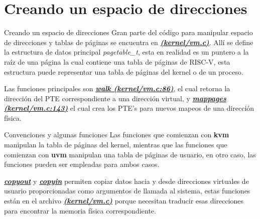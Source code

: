 \documentclass{libs/ufc_format}
\begin{document}
\section{Creando un espacio de direcciones}
\begin{frame}{Creando un espacio de direcciones}
    Gran parte del código para manipular espacio de direcciones y tablas de páginas se encuentra en \href{https://github.com/CarlosSandoval-03/xv6-riscv/blob/riscv/kernel/vm.c}{\textbf{\textit{(kernel/vm.c)}}}. Allí se define la estructura de datos principal \emph{pagetable\_t}, esta en realidad es un puntero a la raíz de una página la cual contiene una tabla de páginas de RISC-V, esta estructura puede representar una tabla de páginas del kernel o de un proceso.

    \vspace{0.4cm}

    Las funciones principales son \href{https://github.com/CarlosSandoval-03/xv6-riscv/blob/riscv/kernel/vm.c\#L86}{\textbf{\textit{walk (kernel/vm.c:86)}}}, el cual retorna la dirección del PTE correspondiente a una dirección virtual, y \href{https://github.com/CarlosSandoval-03/xv6-riscv/blob/riscv/kernel/vm.c\#L143}{\textbf{\textit{mappages (kernel/vm.c:143)}}} el cual crea los PTE's para nuevos mapeos de una dirección física. \cite{xv6_book} \cite{xv6}
\end{frame}
    \begin{frame}{Convenciones y algunas funciones}
    Las funciones que comienzan con \textbf{kvm} manipulan la tabla de páginas del kernel, mientras que las funciones que comienzan con \textbf{uvm} manipulan una tabla de páginas de usuario, en otro caso, las funciones pueden ser empleadas para ambos casos.

    \vspace{0.4cm}

    \href{https://github.com/CarlosSandoval-03/xv6-riscv/blob/riscv/kernel/vm.c\#L352}{\textbf{\textit{copyout}}} y \href{https://github.com/CarlosSandoval-03/xv6-riscv/blob/riscv/kernel/vm.c\#L377}{\textbf{\textit{copyin}}} permiten copiar datos hacia y desde direcciones virtuales de usuario proporcionadas como argumentos de llamada al sistema, estas funciones están en el archivo \href{https://github.com/CarlosSandoval-03/xv6-riscv/blob/riscv/kernel/vm.c}{\textbf{\textit{(kernel/vm.c)}}} porque necesitan traducir esas direcciones para encontrar la memoria física correspondiente. \cite{xv6_book} \cite{xv6}
\end{frame}
\end{document}

